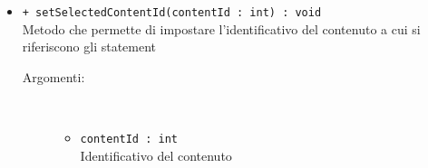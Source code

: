 \documentclass[../Tesi.tex]{subfiles}
\begin{document}
\begin{description}
\begin{itemize}
				\item \texttt{+ setSelectedContentId(contentId : int) : void}\\
				Metodo che permette di impostare l'identificativo del contenuto a cui si riferiscono gli statement
				\begin{description}
					\item[Argomenti:] \
					\begin{itemize}
						\item \texttt{contentId : int}\\
						Identificativo del contenuto
					\end{itemize}
				\end{description}
			\end{itemize}
		\end{description}
\end{document}
